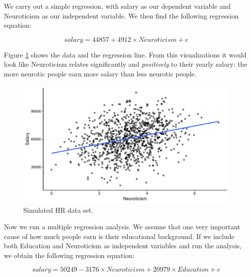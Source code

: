 \documentclass[]{book}\usepackage[]{graphicx}\usepackage[]{color}
\makeatletter
\def\maxwidth{ %
  \ifdim\Gin@nat@width>\linewidth
    \linewidth
  \else
    \Gin@nat@width
  \fi
}
\newenvironment{knitrout}{}{} %
\makeatother
\begin{document}
We carry out a simple regression, with salary as our dependent variable and Neuroticism as our independent variable. We then find the following regression equation:







\begin{equation}
salary = 44857 + 4912 \times Neuroticism + e
\end{equation}


Figure \ref{fig:multi_4} shows the data and the regression line. From this visualizations it would look like Neuroticism relates significantly and \textit{positively} to their yearly salary: the more neurotic people earn more salary than less neurotic people.



\begin{knitrout}
\color{fgcolor}\begin{figure}

{\centering \includegraphics[width=\maxwidth]{figure/multi_4-1} 

}

\caption[Simulated HR data set]{Simulated HR data set.}\label{fig:multi_4}
\end{figure}


\end{knitrout}

Now we run a multiple regression analysis. We assume that one very important cause of how much people earn is their educational background. If we include both Education and Neuroticism as independent variables and run the analysis, we obtain the following regression equation:

\begin{equation}
salary = 50249  -3176 \times Neuroticism + 20979 \times Education + e
\end{equation}
\end{document}
